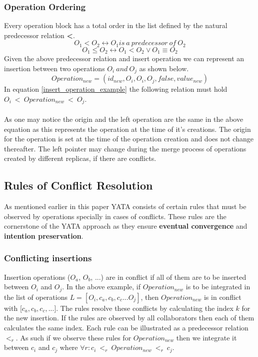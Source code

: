 \documentclass[12pt]{article}
\begin{document}
  \subsubsection{Operation Ordering}
  Every operation block has a total order in the list defined by the natural predecessor relation \textbf{<}.
  \begin{equation}
    O_{1} < O_{2} \leftrightarrow O_{1} is\ a\ predecessor\ of\ O_{2}
  \end{equation}
  \begin{equation}
    O_{1} \leq O_{2} \leftrightarrow O_{1} < O_{2} \lor O_{1} \equiv O_{2}
  \end{equation}
  Given the above predecessor relation and insert operation we can represent an insertion between two operations \(O_{i}\ and\ O_{j}\) as shown below.
  \begin{equation} \label{insert_operation_example}
    Operation_{new} = (id_{new}, O_{i}, O_{i}, O_{j}, false, value_{new})
  \end{equation}
  In equation \ref{insert_operation_example} the following relation must hold \(O_{i}\ <\ Operation_{new}\ <\ O_{j}\).\\\\
  As one may notice the origin and the left operation are the same in the above equation as this represents the operation at the time of it's creations.
  The origin for the operation is set at the time of the operation creation and does not change thereafter.
  The left pointer may change during the merge process of operations created by different replicas, if there are conflicts.

  \subsection{Rules of Conflict Resolution}
  As mentioned earlier in this paper YATA consists of certain rules that must be observed by operations specially in cases of conflicts.
  These rules are the cornerstone of the YATA approach as they ensure \textbf{eventual convergence} and \textbf{intention preservation}.

  \subsubsection{Conflicting insertions}
  Insertion operations (\(O_{a}\), \(O_{b}\), ...) are in conflict if all of them are to be inserted between \(O_{i}\) and \(O_{j}\).
  In the above example, if \(Operation_{new}\) is to be integrated in the list of operations \(L = [O_{i}, c_{a}, c_{b}, c_{c}... O_{j}]\),
  then \(Operation_{new}\) is in conflict with [\(c_{a}, c_{b}, c_{c}, ...\)]. The rules resolve these conflicts by calculating the index \(k\) for the new insertion.
  If the rules are observed by all collaborators then each of them calculates the same index. Each rule can be illustrated as a predecessor relation \(<_{r}\).
  As such if we observe these rules for \(Operation_{new}\) then we integrate it between \(c_{i}\) and \(c_{j}\) where \(\forall r: c_{i}\ <_{r}\ Operation_{new}\ <_{r}\ c_{j}\).
\end{document}

